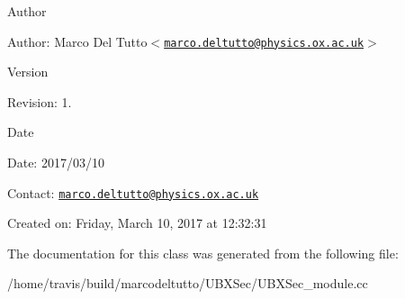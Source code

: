 \begin{DoxyAuthor}{\-Author}

\end{DoxyAuthor}
\begin{DoxyParagraph}{\-Author\-:}
\-Marco \-Del \-Tutto$<$\href{mailto:marco.deltutto@physics.ox.ac.uk}{\tt marco.\-deltutto@physics.\-ox.\-ac.\-uk}$>$ 
\end{DoxyParagraph}


\begin{DoxyVersion}{\-Version}

\end{DoxyVersion}
\begin{DoxyParagraph}{\-Revision\-:}
1. 
\end{DoxyParagraph}


\begin{DoxyDate}{\-Date}

\end{DoxyDate}
\begin{DoxyParagraph}{\-Date\-:}
2017/03/10 
\end{DoxyParagraph}


\-Contact\-: \href{mailto:marco.deltutto@physics.ox.ac.uk}{\tt marco.\-deltutto@physics.\-ox.\-ac.\-uk}

\-Created on\-: \-Friday, \-March 10, 2017 at 12\-:32\-:31 

\-The documentation for this class was generated from the following file\-:\begin{DoxyCompactItemize}
\item 
/home/travis/build/marcodeltutto/\-U\-B\-X\-Sec/\-U\-B\-X\-Sec\-\_\-module.\-cc\end{DoxyCompactItemize}
